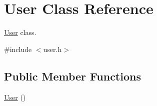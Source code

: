 \hypertarget{class_user}{}\section{User Class Reference}
\label{class_user}


\hyperlink{class_user}{User} class.  




{\ttfamily \#include $<$user.\+h$>$}

\subsection*{Public Member Functions}
\begin{DoxyCompactItemize}
\item 
\hypertarget{class_user_a4a0137053e591fbb79d9057dd7d2283d}{}\hyperlink{class_user_a4a0137053e591fbb79d9057dd7d2283d}{User} ()\label{class_user_a4a0137053e591fbb79d9057dd7d2283d}


\end{DoxyCompactItemize}
